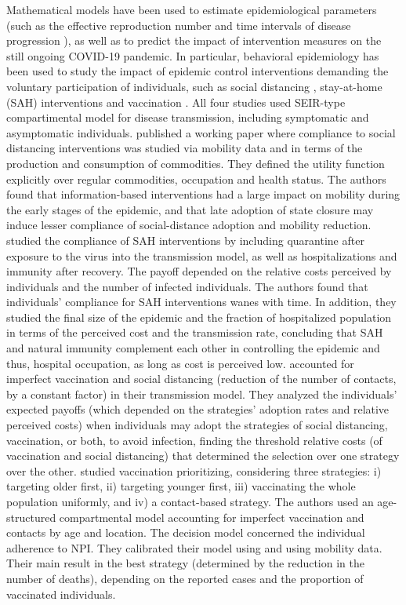 Mathematical models have been used to estimate epidemiological parameters (such as the effective reproduction number and time intervals of disease progression \cite[]{Xiang2021}), as well as to predict the impact of intervention measures \cite[]{Xiang2021} on the still ongoing COVID-19 pandemic. In particular, behavioral epidemiology has been used to study the impact of epidemic control interventions demanding the voluntary participation of individuals, such as social distancing \cite[]{Gupta2020}, stay-at-home (SAH) interventions \cite[]{Kabir2020} and vaccination \cite[]{Choi2020,Jentsch2020}. 
%
All four studies used SEIR-type compartimental model for disease transmission, including symptomatic and asymptomatic individuals. 
%
\cite{Gupta2020} published a working paper where compliance to social distancing interventions was studied via mobility data and in terms of the production and consumption of commodities. They defined the utility function explicitly over regular commodities, occupation and health status. The authors found that information-based interventions had a large impact on mobility during the early stages of the epidemic, and that late adoption of state closure may induce lesser compliance of social-distance adoption and mobility reduction.
%
\cite{Kabir2020} studied the compliance of SAH interventions by including quarantine after exposure to the virus into the transmission model, as well as hospitalizations and immunity after recovery. The payoff depended on the relative costs perceived by individuals and the number of infected individuals. The authors found that individuals' compliance for SAH interventions wanes with time. In addition, they studied the final size of the epidemic and the fraction of hospitalized population in terms of the perceived cost and the transmission rate, concluding that SAH and natural immunity complement each other in controlling the epidemic and thus, hospital occupation, as long as cost is perceived low. 
%
\citet{Choi2020} accounted for imperfect vaccination and social distancing (reduction of the number of contacts, by a constant factor) in their transmission model. They analyzed the individuals' expected payoffs (which depended on the strategies' adoption rates and relative perceived costs) when individuals may adopt the strategies of social distancing, vaccination, or both, to avoid infection, finding the threshold relative costs (of vaccination and social distancing) that determined the selection over one strategy over the other. 
%
\cite{Jentsch2020} studied vaccination prioritizing, considering three strategies: i) targeting older first, ii) targeting younger first, iii) vaccinating the whole population uniformly, and iv) a contact-based strategy. The authors used an age-structured compartmental model accounting for imperfect vaccination and contacts by age and location. The decision model concerned the individual adherence to NPI. They calibrated their model using and using mobility data. Their main result in the best strategy (determined by the reduction in the number of deaths), depending on the reported cases and the proportion of vaccinated individuals.

